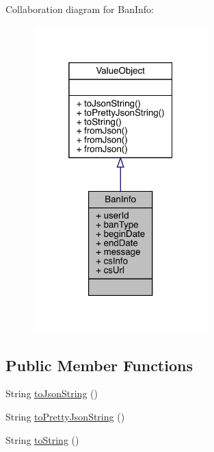 Collaboration diagram for Ban\+Info\+:
\nopagebreak
\begin{figure}[H]
\begin{center}
\leavevmode
\includegraphics[width=193pt]{classcom_1_1toast_1_1android_1_1gamebase_1_1auth_1_1data_1_1_ban_info__coll__graph}
\end{center}
\end{figure}
\subsection*{Public Member Functions}
\begin{DoxyCompactItemize}
\item 
String \hyperlink{classcom_1_1toast_1_1android_1_1gamebase_1_1base_1_1_value_object_a58acf6402880e9769d79d8667581fa6a}{to\+Json\+String} ()
\item 
String \hyperlink{classcom_1_1toast_1_1android_1_1gamebase_1_1base_1_1_value_object_a054431f3d988a22295cfc8b784ff2637}{to\+Pretty\+Json\+String} ()
\item 
String \hyperlink{classcom_1_1toast_1_1android_1_1gamebase_1_1base_1_1_value_object_ad146fa8579a5f8a876c4688cc5a68520}{to\+String} ()
\end{DoxyCompactItemize}
